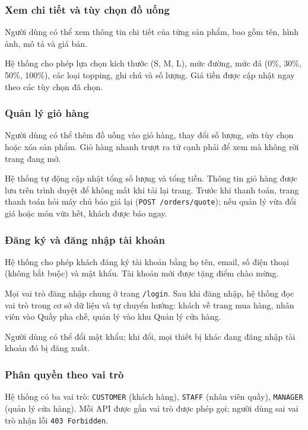 \documentclass[12pt,a4paper]{article}
\begin{document}
\subsubsection{Xem chi tiết và tùy chọn đồ uống}
Người dùng có thể xem thông tin chi tiết của từng sản phẩm, bao gồm tên, hình ảnh, mô tả và giá bán.

Hệ thống cho phép lựa chọn kích thước (S, M, L), mức đường, mức đá (0\%, 30\%, 50\%, 100\%), các loại topping, ghi chú và số lượng. Giá tiền được cập nhật ngay theo các tùy chọn đã chọn.

\subsubsection{Quản lý giỏ hàng}
Người dùng có thể thêm đồ uống vào giỏ hàng, thay đổi số lượng, sửa tùy chọn hoặc xóa sản phẩm. Giỏ hàng nhanh trượt ra từ cạnh phải để xem mà không rời trang đang mở.

Hệ thống tự động cập nhật tổng số lượng và tổng tiền. Thông tin giỏ hàng được lưu trên trình duyệt để không mất khi tải lại trang. Trước khi thanh toán, trang thanh toán hỏi máy chủ báo giá lại (\texttt{POST /orders/quote}); nếu quản lý vừa đổi giá hoặc món vừa hết, khách được báo ngay.

\subsubsection{Đăng ký và đăng nhập tài khoản}
Hệ thống cho phép khách đăng ký tài khoản bằng họ tên, email, số điện thoại (không bắt buộc) và mật khẩu. Tài khoản mới được tặng điểm chào mừng.

Mọi vai trò đăng nhập chung ở trang \texttt{/login}. Sau khi đăng nhập, hệ thống đọc vai trò trong cơ sở dữ liệu và tự chuyển hướng: khách về trang mua hàng, nhân viên vào Quầy pha chế, quản lý vào khu Quản lý cửa hàng.

Người dùng có thể đổi mật khẩu; khi đổi, mọi thiết bị khác đang đăng nhập tài khoản đó bị đăng xuất.

\subsubsection{Phân quyền theo vai trò}
Hệ thống có ba vai trò: \texttt{CUSTOMER} (khách hàng), \texttt{STAFF} (nhân viên quầy), \texttt{MANAGER} (quản lý cửa hàng). Mỗi API được gắn vai trò được phép gọi; người dùng sai vai trò nhận lỗi \texttt{403 Forbidden}.
\end{document}
